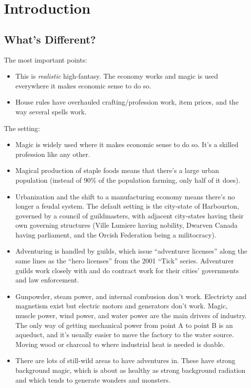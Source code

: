 
\chapter{Introduction}
\label{sect-over}

%
%
%
\section{What's Different?}
\label{sect-over-intro}


The most important points:
\begin{itemize}
%
\item This is \textit{realistic} high-fantasy. The economy works and magic
is used everywhere it makes economic sense to do so.
%
\item House rules have overhauled crafting/profession work, item prices, and
the way several spells work.
%
\end{itemize}

The setting:
\begin{itemize}
%
\item Magic is widely used where it makes economic sense to do so. It's a
skilled profession like any other.
%
\item Magical production of staple foods means that there's a large urban
population (instead of 90\% of the population farming, only half of it does).
%
\item Urbanization and the shift to a manufacturing economy means there's
no longer a feudal system. The default setting is the city-state of
Harbourton, governed by a council of guildmasters, with adjacent city-states
having their own governing structures (Ville Lumiere having nobility,
Dwarven Canada having parliament, and the Orcish Federation being a
militocracy).
%
\item Adventuring is handled by guilds, which issue ``adventurer licenses''
along the same lines as the ``hero licenses'' from the 2001 ``Tick'' series.
Adventurer guilds work closely with and do contract work for their cities'
governments and law enforcement.
%
\item Gunpowder, steam power, and internal combusion don't work. Electricty
and magnetism exist but electric motors and generators don't work. Magic,
muscle power, wind power, and water power are the main drivers of industry.
The only way of getting mechanical power from point A to point B is an
aqueduct, and it's usually easier to move the factory to the water source.
Moving wood or charcoal to where industrial heat is needed is doable.
%
\item There are lots of still-wild areas to have adventures in. These have
strong background magic, which is about as healthy as strong background
radiation and which tends to generate wonders and monsters.
%
\end{itemize}

